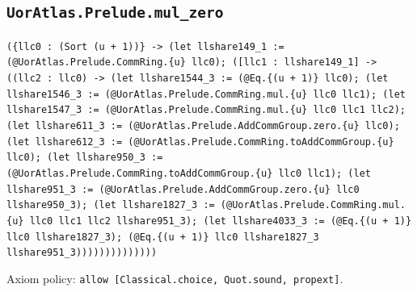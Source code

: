 \documentclass[11pt]{article}
\begin{document}
\subsection*{\texttt{UorAtlas.Prelude.mul\_zero}}
\noindent\texttt{(\{llc0 : (Sort (u + 1))\} -> (let llshare149\_1 := (@UorAtlas.Prelude.CommRing.\{u\} llc0); ([llc1 : llshare149\_1] -> ((llc2 : llc0) -> (let llshare1544\_3 := (@Eq.\{(u + 1)\} llc0); (let llshare1546\_3 := (@UorAtlas.Prelude.CommRing.mul.\{u\} llc0 llc1); (let llshare1547\_3 := (@UorAtlas.Prelude.CommRing.mul.\{u\} llc0 llc1 llc2); (let llshare611\_3 := (@UorAtlas.Prelude.AddCommGroup.zero.\{u\} llc0); (let llshare612\_3 := (@UorAtlas.Prelude.CommRing.toAddCommGroup.\{u\} llc0); (let llshare950\_3 := (@UorAtlas.Prelude.CommRing.toAddCommGroup.\{u\} llc0 llc1); (let llshare951\_3 := (@UorAtlas.Prelude.AddCommGroup.zero.\{u\} llc0 llshare950\_3); (let llshare1827\_3 := (@UorAtlas.Prelude.CommRing.mul.\{u\} llc0 llc1 llc2 llshare951\_3); (let llshare4033\_3 := (@Eq.\{(u + 1)\} llc0 llshare1827\_3); (@Eq.\{(u + 1)\} llc0 llshare1827\_3 llshare951\_3))))))))))))))}\par
\noindent Axiom policy: \texttt{allow [Classical.choice, Quot.sound, propext]}.\par
\end{document}
